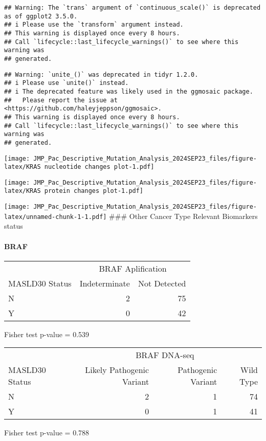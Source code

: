 \documentclass[
]{article}
\begin{document}
\begin{verbatim}
## Warning: The `trans` argument of `continuous_scale()` is deprecated as of ggplot2 3.5.0.
## i Please use the `transform` argument instead.
## This warning is displayed once every 8 hours.
## Call `lifecycle::last_lifecycle_warnings()` to see where this warning was
## generated.
\end{verbatim}

\begin{verbatim}
## Warning: `unite_()` was deprecated in tidyr 1.2.0.
## i Please use `unite()` instead.
## i The deprecated feature was likely used in the ggmosaic package.
##   Please report the issue at <https://github.com/haleyjeppson/ggmosaic>.
## This warning is displayed once every 8 hours.
## Call `lifecycle::last_lifecycle_warnings()` to see where this warning was
## generated.
\end{verbatim}

\texttt{[image: JMP\_Pac\_Descriptive\_Mutation\_Analysis\_2024SEP23\_files/figure-latex/KRAS nucleotide changes plot-1.pdf]}

\texttt{[image: JMP\_Pac\_Descriptive\_Mutation\_Analysis\_2024SEP23\_files/figure-latex/KRAS protein changes plot-1.pdf]}

\texttt{[image: JMP\_Pac\_Descriptive\_Mutation\_Analysis\_2024SEP23\_files/figure-latex/unnamed-chunk-1-1.pdf]}
\pagebreak \#\#\# Other Cancer Type Relevant Biomarkers status

\hypertarget{braf}{%
\paragraph{BRAF}\label{braf}}

\begingroup
\fontsize{12.0pt}{14.4pt}\selectfont
\setlength{\LTpost}{0mm}
\begin{longtable}{l|rr}
\toprule
 & \multicolumn{2}{c}{BRAF Aplification} \\ 
\cmidrule(lr){2-3}
MASLD30 Status & Indeterminate & Not Detected \\ 
\midrule\addlinespace[2.5pt]
N & 2 & 75 \\ 
Y & 0 & 42 \\ 
\bottomrule
\end{longtable}
\begin{minipage}{\linewidth}
Fisher test p-value =  0.539\\
\end{minipage}
\endgroup
\begingroup
\fontsize{12.0pt}{14.4pt}\selectfont
\setlength{\LTpost}{0mm}
\begin{longtable}{l|rrr}
\toprule
 & \multicolumn{3}{c}{BRAF DNA-seq} \\ 
\cmidrule(lr){2-4}
MASLD30 Status & Likely Pathogenic Variant & Pathogenic Variant & Wild Type \\ 
\midrule\addlinespace[2.5pt]
N & 2 & 1 & 74 \\ 
Y & 0 & 1 & 41 \\ 
\bottomrule
\end{longtable}
\begin{minipage}{\linewidth}
Fisher test p-value =  0.788\\
\end{minipage}
\endgroup
\end{document}
